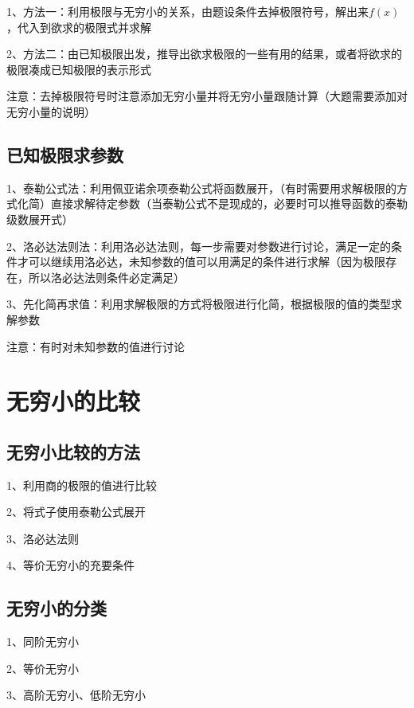 1、方法一：利用极限与无穷小的关系，由题设条件去掉极限符号，解出来$f(x)$，代入到欲求的极限式并求解

2、方法二：由已知极限出发，推导出欲求极限的一些有用的结果，或者将欲求的极限凑成已知极限的表示形式

注意：去掉极限符号时注意添加无穷小量并将无穷小量跟随计算（大题需要添加对无穷小量的说明）



\subsection{已知极限求参数}

1、泰勒公式法：利用佩亚诺余项泰勒公式将函数展开，（有时需要用求解极限的方式化简）直接求解待定参数（当泰勒公式不是现成的，必要时可以推导函数的泰勒级数展开式）

2、洛必达法则法：利用洛必达法则，每一步需要对参数进行讨论，满足一定的条件才可以继续用洛必达，未知参数的值可以用满足的条件进行求解（因为极限存在，所以洛必达法则条件必定满足）

3、先化简再求值：利用求解极限的方式将极限进行化简，根据极限的值的类型求解参数

注意：有时对未知参数的值进行讨论

\section{无穷小的比较}



\subsection{无穷小比较的方法}

1、利用商的极限的值进行比较

2、将式子使用泰勒公式展开

3、洛必达法则

4、等价无穷小的充要条件



\subsection{无穷小的分类}

1、同阶无穷小

2、等价无穷小

3、高阶无穷小、低阶无穷小

